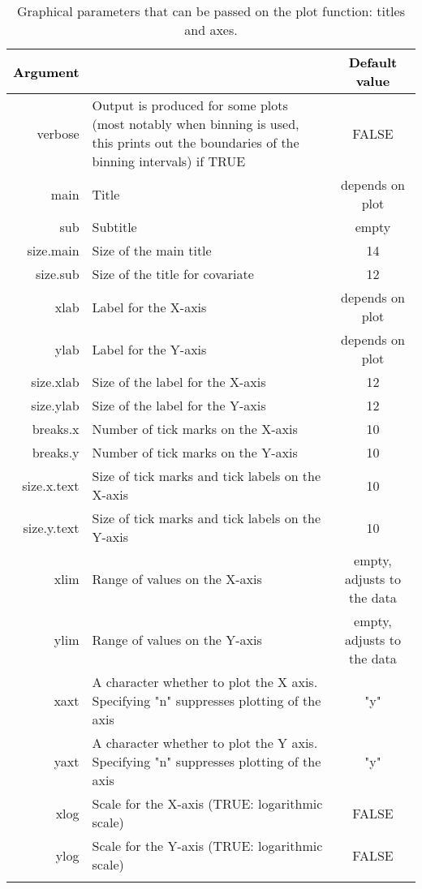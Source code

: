 \begin{table}[!h] 
\begin{center}
\begin{tabular}{| r p{8cm} c|}
\hline
\textbf{\textcolor{black}{Argument}} & \centering{\textbf{\textcolor{black}{Description }}} & \textbf{\textcolor{black}{Default value}} \\
\hline
{\ttfamily verbose} & Output is produced for some plots (most notably when binning is used, this prints out the boundaries of the binning intervals) if TRUE & FALSE \\
{\ttfamily main} & Title & depends on plot \\
{\ttfamily sub } & Subtitle & empty \\
{\ttfamily size.main } & Size of the main title & 14 \\
{\ttfamily size.sub  } & Size of the title for covariate & 12 \\

{\ttfamily xlab} & Label for the X-axis & depends on plot \\
{\ttfamily ylab} & Label for the Y-axis & depends on plot \\
{\ttfamily size.xlab} & Size of the label for the X-axis & 12 \\
{\ttfamily size.ylab} & Size of the label for the Y-axis & 12 \\
{\ttfamily breaks.x} & Number of tick marks on the X-axis & 10 \\
{\ttfamily breaks.y} & Number of tick marks on the Y-axis & 10 \\
{\ttfamily size.x.text} & Size of tick marks and tick labels on the X-axis & 10 \\
{\ttfamily size.y.text} & Size of tick marks and tick labels on the Y-axis & 10 \\

{\ttfamily xlim} & Range of values on the X-axis & empty, adjusts to the data \\
{\ttfamily ylim} & Range of values on the Y-axis & empty, adjusts to the data \\

{\ttfamily xaxt} & A character whether to plot the X axis. Specifying "n" suppresses plotting of the axis & "y"  \\
{\ttfamily yaxt} & A character whether to plot the Y axis. Specifying "n" suppresses plotting of the axis & "y" \\

{\ttfamily xlog} & Scale for the X-axis (TRUE: logarithmic scale) & FALSE \\
{\ttfamily ylog} & Scale for the Y-axis (TRUE: logarithmic scale) & FALSE \\

{\ttfamily } & &  \\
\hline
\end{tabular} 
\end{center}
\caption{Graphical parameters that can be passed on the plot function: titles and axes.} \label{tab:graphicalOptions1}
\end{table} 

